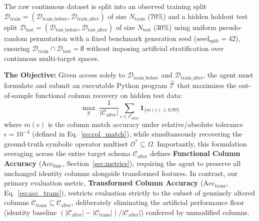 \documentclass[sigconf]{acmart}
\begin{document}
The raw continuous dataset is split into an observed training split $\mathcal{D}_{\text{train}} = (\mathcal{D}_{\text{train\_before}}, \mathcal{D}_{\text{train\_after}})$ of size $N_{\text{train}}$ (70\%) and a hidden holdout test split $\mathcal{D}_{\text{test}} = (\mathcal{D}_{\text{test\_before}}, \mathcal{D}_{\text{test\_after}})$ of size $N_{\text{test}}$ (30\%) using uniform pseudo-random permutation with a fixed benchmark generation seed ($\text{seed}_{\text{split}}=42$), ensuring $\mathcal{D}_{\text{train}} \cap \mathcal{D}_{\text{test}} = \emptyset$ without imposing artificial stratification over continuous multi-target spaces.

\noindent\textbf{The Objective:} Given access solely to $\mathcal{D}_{\text{train\_before}}$ and $\mathcal{D}_{\text{train\_after}}$, the agent must formulate and submit an executable Python program $\widehat{\mathcal{T}}$ that maximizes the out-of-sample functional column recovery on hidden test data:
\begin{equation}
    \max_{\widehat{\mathcal{T}}} \; \frac{1}{|\mathcal{C}_{\text{after}}|} \sum_{c \in \mathcal{C}_{\text{after}}} \mathbf{1}_{\{m(c) \ge 0.99\}}
\end{equation}
where $m(c)$ is the column match accuracy under relative/absolute tolerance $\epsilon = 10^{-4}$ (defined in Eq.~\ref{eq:col_match}), while simultaneously recovering the ground-truth symbolic operator multiset $\mathcal{O}^* \subseteq \Omega$. Importantly, this formulation averaging across the entire target schema $\mathcal{C}_{\text{after}}$ defines \textbf{Functional Column Accuracy} ($\text{Acc}_{\text{func}}$, Section~\ref{sec:metrics}), requiring the agent to preserve all unchanged identity columns alongside transformed features. In contrast, our primary evaluation metric, \textbf{Transformed Column Accuracy} ($\text{Acc}_{\text{trans}}$, Eq.~\ref{eq:acc_trans}), restricts evaluation strictly to the subset of genuinely altered columns $\mathcal{C}_{\text{trans}} \subseteq \mathcal{C}_{\text{after}}$, deliberately eliminating the artificial performance floor (identity baseline $(|\mathcal{C}_{\text{after}}| - |\mathcal{C}_{\text{trans}}|) / |\mathcal{C}_{\text{after}}|$) conferred by unmodified columns.
\end{document}

